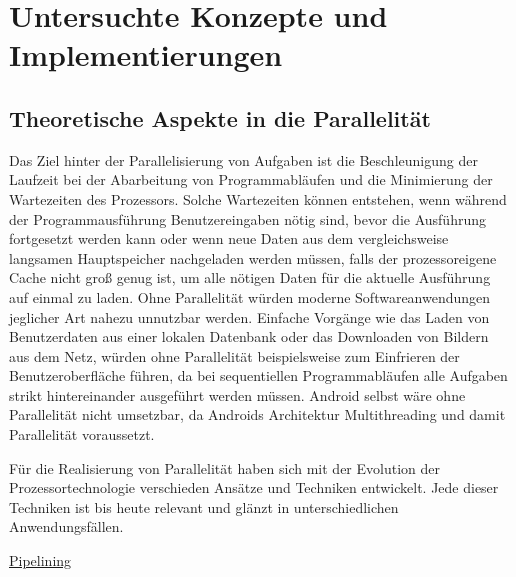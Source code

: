 \chapter{Untersuchte Konzepte und Implementierungen}

\section{Theoretische Aspekte in die Parallelität}
Das Ziel hinter der Parallelisierung von Aufgaben ist die Beschleunigung der Laufzeit bei der Abarbeitung von Programmabläufen und die Minimierung der Wartezeiten des Prozessors. Solche Wartezeiten können entstehen, wenn während der Programmausführung Benutzereingaben nötig sind, bevor die Ausführung fortgesetzt werden kann oder wenn neue Daten aus dem vergleichsweise langsamen Hauptspeicher nachgeladen werden müssen, falls der prozessoreigene Cache nicht groß genug ist, um alle nötigen Daten für die aktuelle Ausführung auf einmal zu laden\cite[1135]{wolf2020}. Ohne Parallelität würden moderne Softwareanwendungen jeglicher Art nahezu unnutzbar werden. Einfache Vorgänge wie das Laden von Benutzerdaten aus einer lokalen Datenbank oder das Downloaden von Bildern aus dem Netz, würden ohne Parallelität beispielsweise zum Einfrieren der Benutzeroberfläche führen, da bei sequentiellen Programmabläufen alle Aufgaben strikt hintereinander ausgeführt werden müssen. Android selbst wäre ohne Parallelität nicht umsetzbar, da Androids Architektur Multithreading und damit Parallelität voraussetzt.

Für die Realisierung von Parallelität haben sich mit der Evolution der Prozessortechnologie verschieden Ansätze und Techniken entwickelt. Jede dieser Techniken ist bis heute relevant und glänzt in unterschiedlichen Anwendungsfällen.

\underline{Pipelining}

